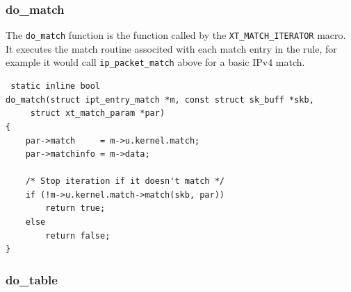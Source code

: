 \documentclass[a4paper,10pt]{article}
\newcommand{\code}[1]{\texttt{{#1}}}
\begin{document}
\subsubsection{do\_match}
The \code{do\_match} function is the function called by the
\code{XT\_MATCH\_ITERATOR} macro. It executes the match routine
associted with each match entry in the rule, for example it would call
\code{ip\_packet\_match} above for a basic IPv4 match.

\lstset{stepnumber=0}
\begin{lstlisting}
 static inline bool
do_match(struct ipt_entry_match *m, const struct sk_buff *skb,
	 struct xt_match_param *par)
{
	par->match     = m->u.kernel.match;
	par->matchinfo = m->data;

	/* Stop iteration if it doesn't match */
	if (!m->u.kernel.match->match(skb, par))
		return true;
	else
		return false;
}
\end{lstlisting}

\subsubsection{do\_table}
\end{document}
